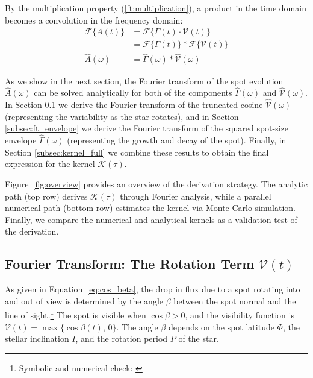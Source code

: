 \documentclass[preprint]{aastex702}
\newcommand\NotebookLink[1]{\href{\GitHubURL/blob/\GitHubSHA/notebooks/#1}{\texttt{\detokenize{#1}}}}
\begin{document}
By the multiplication property (\ref{ft:multiplication}), a product in the time domain becomes a convolution in the frequency domain:
\begin{align}
    \mathcal{F}\{ A(t) \} &= \mathcal{F}\{ \Gamma(t) \cdot \mathcal{V}(t) \} \\
        &= \mathcal{F}\{ \Gamma(t) \} \ast \mathcal{F}\{ \mathcal{V}(t)  \} \\
        \hat{A}(\omega) &= \hat{\Gamma}(\omega) \ast \hat{\mathcal{V}}(\omega)
        \label{eqn:ft_At}
\end{align}

As we show in the next section, the Fourier transform of the spot evolution $\hat{A}(\omega)$ can be solved analytically for both of the components $\hat{\Gamma}(\omega)$ and $\hat{\mathcal{V}}(\omega)$. In Section \ref{subsec:ft_cosine} we derive the Fourier transform of the truncated cosine $\hat{\mathcal{V}}(\omega)$ (representing the variability as the star rotates), and in Section \ref{subsec:ft_envelope} we derive the Fourier transform of the squared spot-size envelope $\hat{\Gamma}(\omega)$ (representing the growth and decay of the spot). Finally, in Section \ref{subsec:kernel_full} we combine these results to obtain the final expression for the kernel $\mathcal{K}(\tau)$.



Figure~\ref{fig:overview} provides an overview of the derivation strategy. The analytic path (top row) derives $\mathcal{K}(\tau)$ through Fourier analysis, while a parallel numerical path (bottom row) estimates the kernel via Monte Carlo simulation. Finally, we compare the numerical and analytical kernels as a validation test of the derivation.

\subsection{Fourier Transform: The Rotation Term $\mathcal{V}(t)$} \label{subsec:ft_cosine}

As given in Equation~\ref{eq:cos_beta}, the drop in flux due to a spot rotating into and out of view is determined by the angle $\beta$ between the spot normal and the line of sight.\footnote{Symbolic and numerical check: \NotebookLink{derive_ft_spot_rotation.ipynb}} The spot is visible when $\cos\beta > 0$, and the visibility function is $\mathcal{V}(t) = \max\{\cos\beta(t),\,0\}$. The angle $\beta$ depends on the spot latitude $\Phi$, the stellar inclination $I$, and the rotation period $P$ of the star. 
\end{document}
